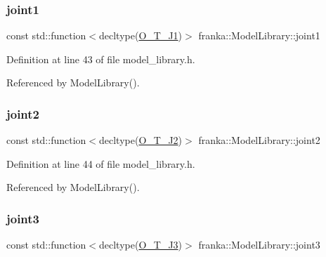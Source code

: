 \mbox{\label{classfranka_1_1ModelLibrary_a7683563473a41174beaaeb0d7cbdc8fb}} 
\subsubsection{\texorpdfstring{joint1}{joint1}}
{\footnotesize\ttfamily const std\+::function$<$decltype(\hyperlink{libfcimodels_8h_ac2b2c464a5e5c2f9142e442844f50874}{O\+\_\+\+T\+\_\+\+J1})$>$ franka\+::\+Model\+Library\+::joint1}



Definition at line 43 of file model\+\_\+library.\+h.



Referenced by Model\+Library().

\mbox{\label{classfranka_1_1ModelLibrary_aec6f1e37865014df93fefed447b9d844}} 
\subsubsection{\texorpdfstring{joint2}{joint2}}
{\footnotesize\ttfamily const std\+::function$<$decltype(\hyperlink{libfcimodels_8h_a006f34ae0fbae39fcdee9254033e9d93}{O\+\_\+\+T\+\_\+\+J2})$>$ franka\+::\+Model\+Library\+::joint2}



Definition at line 44 of file model\+\_\+library.\+h.



Referenced by Model\+Library().

\mbox{\label{classfranka_1_1ModelLibrary_a863bedfd4810a18b2a6c73d0a05f7309}} 
\subsubsection{\texorpdfstring{joint3}{joint3}}
{\footnotesize\ttfamily const std\+::function$<$decltype(\hyperlink{libfcimodels_8h_aee9c6555cf5d94752cfee040755e362d}{O\+\_\+\+T\+\_\+\+J3})$>$ franka\+::\+Model\+Library\+::joint3}



